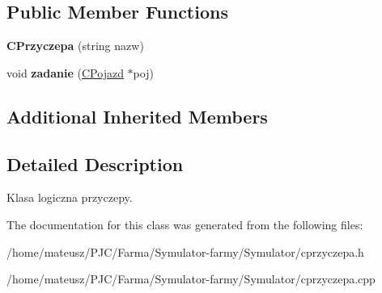 \subsection*{Public Member Functions}
\begin{DoxyCompactItemize}
\item 
\mbox{\label{class_c_przyczepa_a80988d4624ce1dcb085584d6fc2aed73}} 
{\bfseries C\+Przyczepa} (string nazw)
\item 
\mbox{\label{class_c_przyczepa_a8396d3e9c56e23464dbfe3e62f6b21db}} 
void {\bfseries zadanie} (\mbox{\hyperlink{class_c_pojazd}{C\+Pojazd}} $\ast$poj)
\end{DoxyCompactItemize}
\subsection*{Additional Inherited Members}


\subsection{Detailed Description}
Klasa logiczna przyczepy. 



The documentation for this class was generated from the following files\+:\begin{DoxyCompactItemize}
\item 
/home/mateusz/\+P\+J\+C/\+Farma/\+Symulator-\/farmy/\+Symulator/cprzyczepa.\+h\item 
/home/mateusz/\+P\+J\+C/\+Farma/\+Symulator-\/farmy/\+Symulator/cprzyczepa.\+cpp\end{DoxyCompactItemize}
